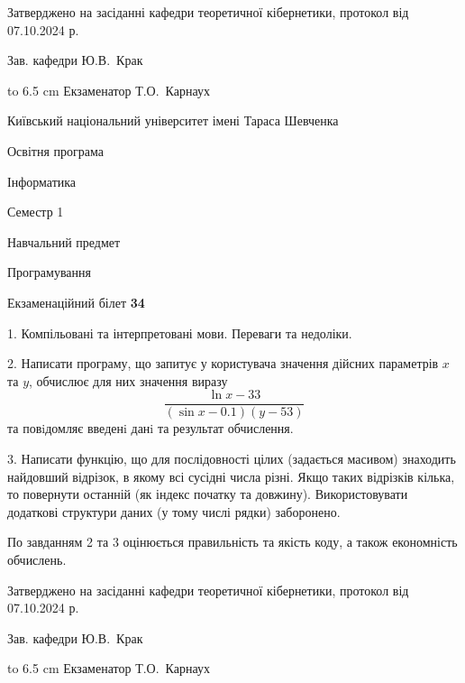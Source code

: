 \documentclass[12pt, ukrainian]{article}
\begin{document}
{\smallskip\smallskip \begin {scriptsize} Затверджено на засіданні кафедри теоретичної кібернетики, протокол   від   07.10.2024 р.\par\smallskip\smallskip\smallskip\smallskip
{\parbox {6.5 cm} {Зав. кафедри \dotfill Ю.В.~Крак}}\hspace {0.7cm} {\hbox to 6.5 cm { Екзаменатор \dotfill Т.О.~Карнаух}} \end{scriptsize}}
\newpage
{{\begin {scriptsize}\par
{ \center  Київський національний університет імені Тараса Шевченка \par}
{\parbox {5 cm}{Освітня програма \hfill}{\parbox {7 cm}{Інформатика\hfill}}\parbox {6 cm}{\hfill Семестр 1}}\par
{\parbox {5 cm} {Навчальний предмет \hfill}\parbox {7 cm}{Програмування \hfill}\parbox {6cm}{\hfill}\par}\vspace{-15pt} \end{scriptsize}}{\center Екзаменаційний білет \No \textbf { 34 }\par}}
{%
1. Компільовані та інтерпретовані мови. Переваги та недоліки.%
\par
2. Написати програму, що запитує у користувача значення дійсних параметрів $x$ та $y$, обчислює для них значення виразу 
$$\frac{\ln x - 33}{(\sin x - 0.1) (y - 53)}$$ 
та повiдомляє введенi данi та результат обчислення.

\par
3. Написати функцію, що для послідовності цілих (задається масивом) знаходить найдовший відрізок, в якому всі сусідні числа різні. Якщо таких відрізків кілька, то повернути останній (як індекс початку та довжину). Використовувати додаткові структури даних (у тому числі рядки) заборонено.

По завданням 2 та 3 оцінюється правильність та якість коду, а також економність обчислень.

}
{\smallskip\smallskip \begin {scriptsize} Затверджено на засіданні кафедри теоретичної кібернетики, протокол   від   07.10.2024 р.\par\smallskip\smallskip\smallskip\smallskip
{\parbox {6.5 cm} {Зав. кафедри \dotfill Ю.В.~Крак}}\hspace {0.7cm} {\hbox to 6.5 cm { Екзаменатор \dotfill Т.О.~Карнаух}} \end{scriptsize}}
\vspace{0.9cm}
\end{document}
